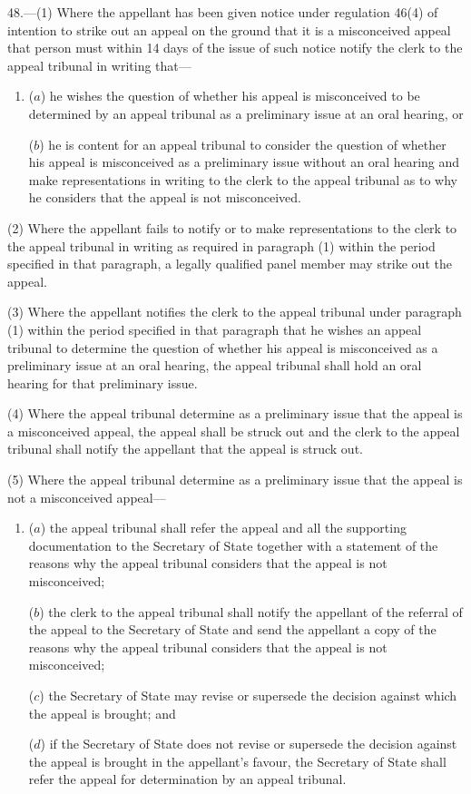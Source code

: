\documentclass[12pt,a4paper]{article}
\begin{document}
48.—(1) Where the appellant has been given notice under regulation 46(4) of intention to strike out an appeal on the ground that it is a misconceived appeal that person must within 14 days of the issue of such notice notify the clerk to the appeal tribunal in writing that—
\begin{enumerate}\item[]
($a$) he wishes the question of whether his appeal is misconceived to be determined by an appeal tribunal as a preliminary issue at an oral hearing, or

($b$) he is content for an appeal tribunal to consider the question of whether his appeal is misconceived as a preliminary issue without an oral hearing and make representations in writing to the clerk to the appeal tribunal as to why he considers that the appeal is not misconceived.
\end{enumerate}

(2) Where the appellant fails to notify or to make representations to the clerk to the appeal tribunal in writing as required in paragraph (1) within the period specified in that paragraph, a legally qualified panel member may strike out the appeal.

(3) Where the appellant notifies the clerk to the appeal tribunal under paragraph (1) within the period specified in that paragraph that he wishes an appeal tribunal to determine the question of whether his appeal is misconceived as a preliminary issue at an oral hearing, the appeal tribunal shall hold an oral hearing for that preliminary issue.

(4) Where the appeal tribunal determine as a preliminary issue that the appeal is a misconceived appeal, the appeal shall be struck out and the clerk to the appeal tribunal shall notify the appellant that the appeal is struck out.

(5) Where the appeal tribunal determine as a preliminary issue that the appeal is not a misconceived appeal—
\begin{enumerate}\item[]
($a$) the appeal tribunal shall refer the appeal and all the supporting documentation to the Secretary of State together with a statement of the reasons why the appeal tribunal considers that the appeal is not misconceived;

($b$) the clerk to the appeal tribunal shall notify the appellant of the referral of the appeal to the Secretary of State and send the appellant a copy of the reasons why the appeal tribunal considers that the appeal is not misconceived;

($c$) the Secretary of State may revise or supersede the decision against which the appeal is brought; and

($d$) if the Secretary of State does not revise or supersede the decision against the appeal is brought in the appellant’s favour, the Secretary of State shall refer the appeal for determination by an appeal tribunal.
\end{enumerate}
\end{document}
